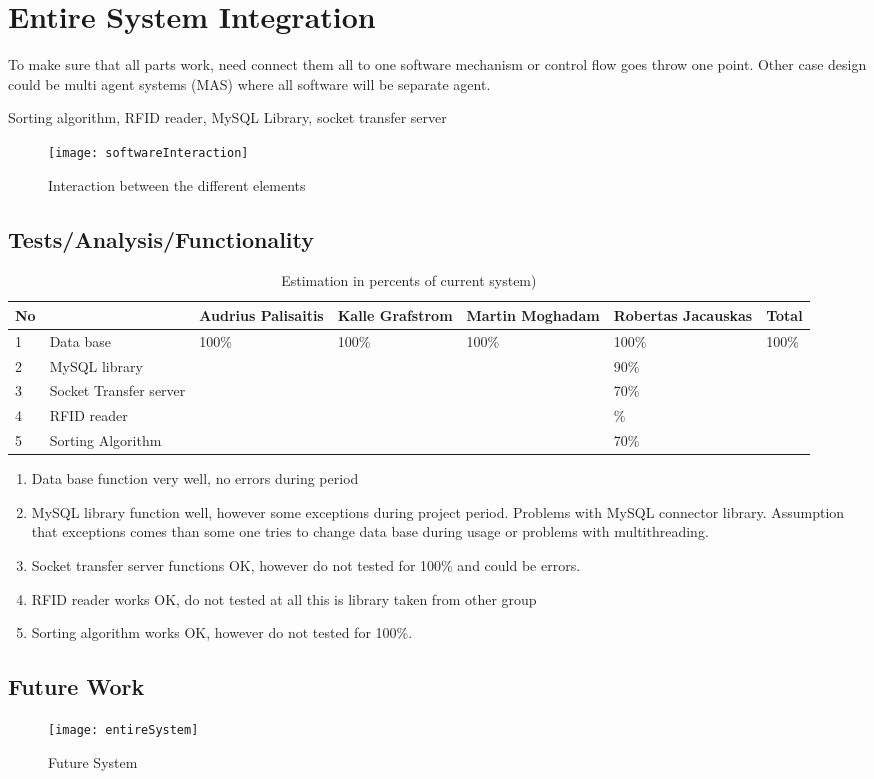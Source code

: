 %
\section{Entire System Integration}

To make sure that all parts work, need connect them all to one software mechanism or control flow goes throw one point. Other case design could be multi agent systems (MAS) where all software will be separate agent.

Sorting algorithm, RFID reader, MySQL Library, socket transfer server

\begin{figure}[h]
	\centering
		\texttt{[image: softwareInteraction]}
	\caption{Interaction between the different elements}
	\label{fig:planning}
\end{figure}


\subsection{Tests/Analysis/Functionality}

\begin{table}[h]
	
    \begin{tabular}{ | p{0.5cm} | p{3.5cm} | p{1.6cm} | p{1.6cm} |p{1.6cm} |p{1.6cm} |p{1cm} |}
    \hline
	No &  & Audrius Palisaitis & Kalle Grafstrom & Martin Moghadam & Robertas Jacauskas & Total\\ \hline
	1 & Data base & 100\% & 100\% & 100\% & 100\% & 100\% \\ \hline
	2 & MySQL library &  &  &  & 90\% &  \\ \hline
	3 & Socket Transfer server &  &  &  & 70\% &  \\ \hline
	4 & RFID reader &  &  &  & \% &  \\ \hline
	5 & Sorting Algorithm &  &  &  & 70\% &  \\ \hline
    \end{tabular}
	\caption{Estimation in percents of current system)}
	\label{tab:percentSystem}
\end{table}

\begin{enumerate}
	\item Data base function very well, no errors during period
	\item MySQL library function well, however some exceptions during project period. Problems with MySQL connector library. Assumption that exceptions comes than some one tries to change data base during usage or problems with multithreading.
	\item Socket transfer server functions OK, however do not tested for 100\% and could be errors.
	\item RFID reader works OK, do not tested at all this is library taken from other group
	\item Sorting algorithm works OK, however do not tested for 100\%.
\end{enumerate}

\subsection{Future Work}

\begin{figure}[h]
	\centering
		\texttt{[image: entireSystem]}
	\caption{Future System}
	\label{fig:planning}
\end{figure}